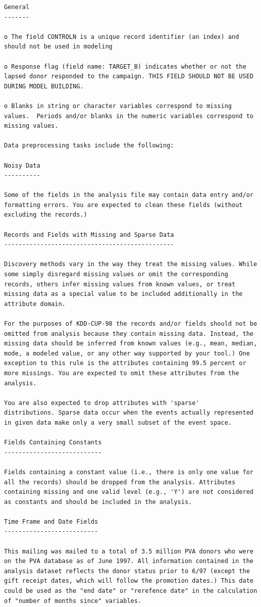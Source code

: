\documentclass[
  11pt,
  a4paper,
  DIV=12,captions=tableheading,oneside,titlepage]{scrbook}
\begin{document}
\begin{verbatim}
General 
-------

o The field CONTROLN is a unique record identifier (an index) and
should not be used in modeling

o Response flag (field name: TARGET_B) indicates whether or not the
lapsed donor responded to the campaign. THIS FIELD SHOULD NOT BE USED
DURING MODEL BUILDING.

o Blanks in string or character variables correspond to missing
values.  Periods and/or blanks in the numeric variables correspond to
missing values.

Data preprocessing tasks include the following:

Noisy Data
----------

Some of the fields in the analysis file may contain data entry and/or
formatting errors. You are expected to clean these fields (without
excluding the records.)

Records and Fields with Missing and Sparse Data
-----------------------------------------------

Discovery methods vary in the way they treat the missing values. While
some simply disregard missing values or omit the corresponding
records, others infer missing values from known values, or treat
missing data as a special value to be included additionally in the
attribute domain.

For the purposes of KDD-CUP-98 the records and/or fields should not be
omitted from analysis because they contain missing data. Instead, the
missing data should be inferred from known values (e.g., mean, median,
mode, a modeled value, or any other way supported by your tool.) One
exception to this rule is the attributes containing 99.5 percent or
more missings. You are expected to omit these attributes from the
analysis.

You are also expected to drop attributes with 'sparse'
distributions. Sparse data occur when the events actually represented
in given data make only a very small subset of the event space.

Fields Containing Constants
---------------------------

Fields containing a constant value (i.e., there is only one value for
all the records) should be dropped from the analysis. Attributes
containing missing and one valid level (e.g., 'Y') are not considered
as constants and should be included in the analysis.

Time Frame and Date Fields
--------------------------

This mailing was mailed to a total of 3.5 million PVA donors who were
on the PVA database as of June 1997. All information contained in the
analysis dataset reflects the donor status prior to 6/97 (except the
gift receipt dates, which will follow the promotion dates.) This date
could be used as the "end date" or "rerefence date" in the calculation
of "number of months since" variables.


\end{verbatim}
\end{document}
